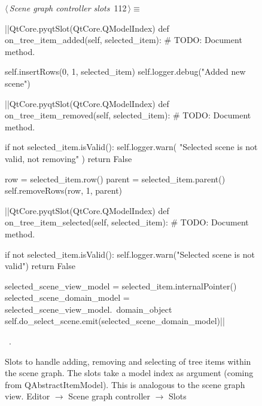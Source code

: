 \documentclass[%
    a4paper,    %
    justified,  %
    nobib,      %
    openany     %
]{tufte-book}
\makeatletter
\renewcommand{\label}[1]{\@tufte@label{##1}}%
\makeatother
\begin{document}
\begin{figure}[!htbp]
\begin{flushleft} \small
\begin{minipage}{\linewidth}\label{scrap49}\raggedright\small
{} $\langle\,${\itshape Scene graph controller slots}\nobreak\ {\footnotesize {112}}$\,\rangle\equiv$
\vspace{-1ex}
\begin{pythoncode}
|\normalfont{}\fontfamily{}|QtCore.pyqtSlot(QtCore.QModelIndex)
def on_tree_item_added(self, selected_item):
    # TODO: Document method.

    self.insertRows(0, 1, selected_item)
    self.logger.debug("Added new scene")

|\normalfont{}\fontfamily{}|QtCore.pyqtSlot(QtCore.QModelIndex)
def on_tree_item_removed(self, selected_item):
    # TODO: Document method.

    if not selected_item.isValid():
        self.logger.warn(
            "Selected scene is not valid, not removing"
        )
        return False

    row = selected_item.row()
    parent = selected_item.parent()
    self.removeRows(row, 1, parent)

|\normalfont{}\fontfamily{}|QtCore.pyqtSlot(QtCore.QModelIndex)
def on_tree_item_selected(self, selected_item):
    # TODO: Document method.

    if not selected_item.isValid():
        self.logger.warn("Selected scene is not valid")
        return False

    selected_scene_view_model = selected_item.internalPointer()
    selected_scene_domain_model  = selected_scene_view_model.\
        domain_object
    self.do_select_scene.emit(selected_scene_domain_model)|\NWsep|
\end{pythoncode}
\vspace{1.5ex}
\footnotesize
\begin{list}{}{\setlength{\itemsep}{-\parsep}\setlength{\itemindent}{-\leftmargin}}
\item \NWtxtMacroRefIn\ \NWlink{nuweb96a}{96a}.

\item{}
\end{list}
\end{minipage}\vspace{4ex}
\end{flushleft}
\caption{Slots to handle adding, removing and selecting of tree items within the
  scene graph. The slots take a model index as argument (coming from
  QAbstractItemModel). This is analogous to the scene graph view.
  \newline{}\newline{}Editor $\rightarrow$ Scene graph controller
  $\rightarrow$ Slots}
\end{figure}
\end{document}
